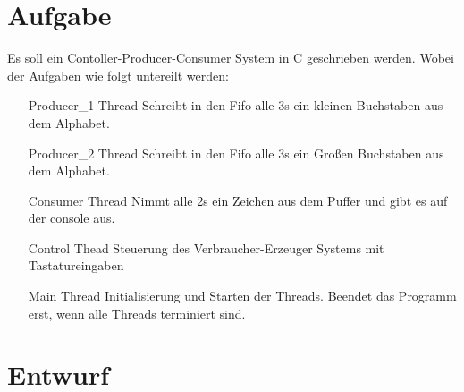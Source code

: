 \documentclass[draft=false
              ,paper=a4
              ,twoside=false
              ,fontsize=11pt
              ,headsepline
              ,BCOR10mm
              ,DIV11
              ]{scrartcl}
\begin{document}

\newcommand{\RNum}[1]{\uppercase\expandafter{\romannumeral #1\relax}}


\maketitle

\onehalfspacing

\newpage
\singlespacing

\newpage

\onehalfspacing

\section{Aufgabe}
  Es soll ein Contoller-Producer-Consumer System in C geschrieben werden. Wobei der Aufgaben wie folgt untereilt werden:
  \begin{enumerate}
     \item[Producer\_1 Thread] Schreibt in den Fifo alle 3s ein kleinen Buchstaben aus dem Alphabet. 
     \item[Producer\_2 Thread] Schreibt in den Fifo alle 3s ein Großen Buchstaben aus dem Alphabet. 
     \item[Consumer Thread] Nimmt alle 2s ein Zeichen aus dem Puffer und gibt es auf der console aus.
     \item[Control Thead] Steuerung des Verbraucher-Erzeuger Systems mit Tastatureingaben  
     \item[Main Thread] Initialisierung und Starten der Threads. Beendet das Programm erst, wenn alle Threads terminiert sind.
  \end{enumerate} 

\section{Entwurf}
\end{document}
